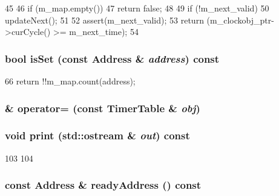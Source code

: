 \begin{DoxyCode}
45 {
46     if (m_map.empty())
47         return false;
48 
49     if (!m_next_valid) {
50         updateNext();
51     }
52     assert(m_next_valid);
53     return (m_clockobj_ptr->curCycle() >= m_next_time);
54 }
\end{DoxyCode}
\hypertarget{classTimerTable_af88cb5939b3467b1d758aef5ec470283}{
\subsubsection[{isSet}]{\setlength{\rightskip}{0pt plus 5cm}bool isSet (const {\bf Address} \& {\em address}) const}}
\label{classTimerTable_af88cb5939b3467b1d758aef5ec470283}



\begin{DoxyCode}
66 { return !!m_map.count(address); }
\end{DoxyCode}
\hypertarget{classTimerTable_a569facea7e509f7f50d1ae82527db0d2}{
\subsubsection[{operator=}]{\& operator= (const {\bf TimerTable} \& {\em obj})}}
\label{classTimerTable_a569facea7e509f7f50d1ae82527db0d2}
\hypertarget{classTimerTable_ac55fe386a101fbae38c716067c9966a0}{
\subsubsection[{print}]{\setlength{\rightskip}{0pt plus 5cm}void print (std::ostream \& {\em out}) const}}
\label{classTimerTable_ac55fe386a101fbae38c716067c9966a0}



\begin{DoxyCode}
103 {
104 }
\end{DoxyCode}
\hypertarget{classTimerTable_af365d2a04bb754f7422868d41432909a}{
\subsubsection[{readyAddress}]{\setlength{\rightskip}{0pt plus 5cm}const {\bf Address} \& readyAddress () const}}
\label{classTimerTable_af365d2a04bb754f7422868d41432909a}



